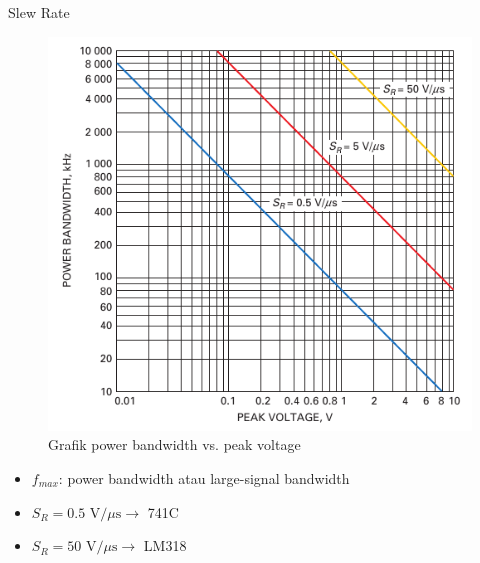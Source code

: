 \begin{frame}{Slew Rate}
	\begin{multicols}{2}
		\begin{figure}
			\centering
			\includegraphics[width=0.8\linewidth]{gambar/fig-16.10}
			\caption{Grafik power bandwidth vs. peak voltage}
			\label{fig-16.10}
		\end{figure}
		\columnbreak
		\begin{itemize}
			\item  $ f_{max} $: power bandwidth atau large-signal bandwidth
			\item $ S_R = 0.5 \text{ V/}\mu\text{s} \rightarrow $ 741C
			\item $ S_R = 50 \text{ V/}\mu\text{s} \rightarrow $ LM318
		\end{itemize}
	\end{multicols}	
\end{frame}

